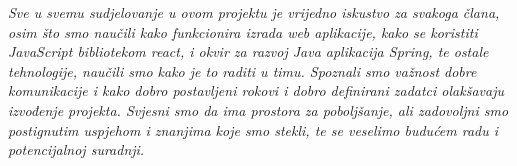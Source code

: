           \textit{Sve u svemu sudjelovanje u ovom projektu je vrijedno iskustvo za svakoga člana, osim što smo naučili kako funkcionira izrada web aplikacije, kako se koristiti JavaScript bibliotekom react, i okvir za razvoj Java aplikacija Spring, te ostale tehnologije, naučili smo kako je to raditi u timu.  Spoznali smo važnost dobre komunikacije i kako dobro postavljeni rokovi i dobro definirani zadatci olakšavaju izvođenje projekta. Svjesni smo da ima prostora za poboljšanje, ali zadovoljni smo postignutim uspjehom i znanjima koje smo stekli, te se veselimo budućem radu i potencijalnoj suradnji.}
		
		\eject 

